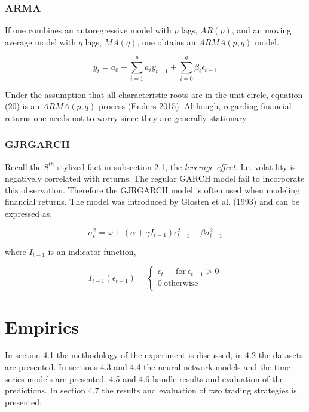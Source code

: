 \documentclass[12pt, letterpaper]{amsart}%
\begin{document}
\subsubsection{ARMA}
If one combines an autoregressive model with $p$ lags, $AR(p)$, and an moving average model with $q$ lags, $MA(q)$, one obtains an $ARMA(p,q)$ model.

\begin{equation}
y_t = a_0 + \sum_{i=1}^p a_i y_{t-1} + \sum_{i=0}^q \beta_i \epsilon_{t-1} 
\end{equation}

Under the assumption that all characteristic roots are in the unit circle, equation (20) is an $ARMA(p,q)$ process (Enders 2015). Although, regarding financial returns one needs not to worry since they are generally stationary.

\subsubsection{GJRGARCH}
Recall the $8^{th}$ stylized fact in subsection 2.1, the \textit{leverage effect}. I.e. volatility is negatively correlated with returns. The regular GARCH model fail to incorporate this observation. Therefore the GJRGARCH model is often used when modeling financial returns. The model was introduced by Glosten et al. (1993) and can be expressed as,

\begin{equation}
\sigma_t^2 = \omega + (\alpha + \gamma I_{t-1}) \epsilon_{t-1}^2 + \beta \sigma^2_{t-1}
\end{equation}

where $I_{t-1}$ is an indicator function,

\begin{equation}
I_{t-1}(\epsilon_{t-1}) = 
     \begin{cases}
       \epsilon_{t-1} \ \text{for} \ \epsilon_{t-1} > 0 \\
       0 \ \text{otherwise} \\ 
     \end{cases}
\end{equation}


\section{Empirics}
In section 4.1 the methodology of the experiment is discussed, in 4.2 the datasets are presented. In sections 4.3 and 4.4 the neural network models and the time series models are presented. 4.5 and 4.6 handle results and evaluation of the predictions. In section 4.7 the results and evaluation of two trading strategies is presented.
\end{document}
